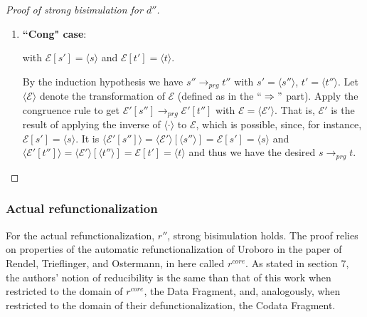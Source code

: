 \documentclass[11pt]{article} %
\begin{document}
\begin{proof}[Proof of strong bisimulation for $d''$]
\begin{enumerate}
were $prg'$ a well-typed program with copattern coverage for all subterms of $s$. Both of those properties can be shown or simulated similarly to the way they are in the $`` \Rightarrow "$ part.

But it is $prg' \subseteq prg$, as can be seen in the definition of $d''$. This implies the desired $s \longrightarrow_{prg} t$.

\item \textbf{``Cong" case}:

\begin{prooftree}
\end{prooftree}

with $\mathcal{E}[s'] = \langle s \rangle$ and $\mathcal{E}[t'] = \langle t \rangle$.

By the induction hypothesis we have $s'' \longrightarrow_{prg} t''$ with $s' = \langle s'' \rangle$, $t' = \langle t'' \rangle$. Let $\langle \mathcal{E} \rangle$ denote the transformation of $\mathcal{E}$ (defined as in the $`` \Rightarrow "$ part). Apply the congruence rule to get $\mathcal{E}'[s''] \longrightarrow_{prg} \mathcal{E}'[t'']$ with $\mathcal{E} = \langle \mathcal{E}' \rangle$. That is, $\mathcal{E}'$ is the result of applying the inverse of $\langle \cdot \rangle$ to $\mathcal{E}$, which is possible, since, for instance, $\mathcal{E}[s'] = \langle s \rangle$. It is $\langle \mathcal{E}'[s''] \rangle = \langle \mathcal{E}' \rangle[\langle s'' \rangle] = \mathcal{E}[s'] = \langle s \rangle$ and $\langle \mathcal{E}'[t''] \rangle = \langle \mathcal{E}' \rangle[\langle t'' \rangle] = \mathcal{E}[t'] = \langle t \rangle$ and thus we have the desired $s \longrightarrow_{prg} t$.
\end{enumerate}

\end{proof}

\subsubsection{Actual refunctionalization}

For the actual refunctionalization, $r''$, strong bisimulation holds. The proof relies on properties of the automatic refunctionalization of Uroboro in the paper of Rendel, Trieflinger, and Ostermann, in here called $r^{core}$. As stated in section 7, the authors' notion of reducibility is the same than that of this work when restricted to the domain of $r^{core}$, the Data Fragment, and, analogously, when restricted to the domain of their defunctionalization, the Codata Fragment.
\end{document}
